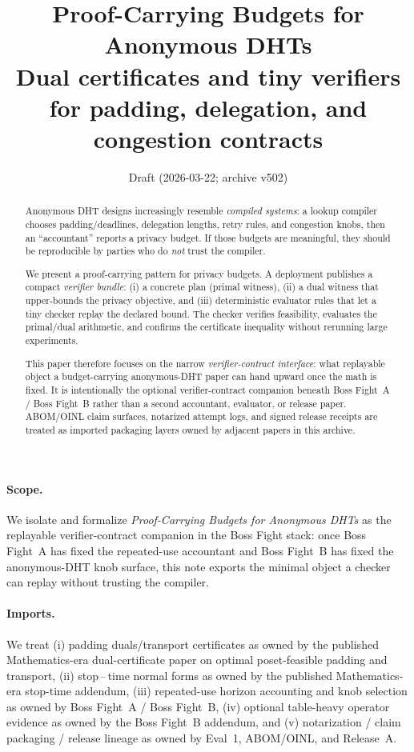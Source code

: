 \documentclass[11pt]{article}
\title{Proof-Carrying Budgets for Anonymous DHTs\\
\large Dual certificates and tiny verifiers for padding, delegation, and congestion contracts}
\author{}
\date{Draft (2026-03-22; archive v502)}
\begin{document}
\maketitle

\begin{abstract}
Anonymous DHT designs increasingly resemble \emph{compiled systems}: a lookup compiler chooses padding/deadlines, delegation lengths, retry rules, and congestion knobs, then an ``accountant'' reports a privacy budget.
If those budgets are meaningful, they should be reproducible by parties who do \emph{not} trust the compiler.

We present a proof-carrying pattern for privacy budgets.
A deployment publishes a compact \emph{verifier bundle}: (i) a concrete plan (primal witness), (ii) a dual witness that upper-bounds the privacy objective, and (iii) deterministic evaluator rules that let a tiny checker replay the declared bound.
The checker verifies feasibility, evaluates the primal/dual arithmetic, and confirms the certificate inequality without rerunning large experiments.

This paper therefore focuses on the narrow \emph{verifier-contract interface}: what replayable object a budget-carrying anonymous-DHT paper can hand upward once the math is fixed.
It is intentionally the optional verifier-contract companion beneath Boss Fight~A / Boss Fight~B rather than a second accountant, evaluator, or release paper.
ABOM/OINL claim surfaces, notarized attempt logs, and signed release receipts are treated as imported packaging layers owned by adjacent papers in this archive.
\end{abstract}

\paragraph{Scope.}
We isolate and formalize \emph{Proof-Carrying Budgets for Anonymous DHTs} as the replayable verifier-contract companion in the Boss Fight stack: once Boss Fight~A has fixed the repeated-use accountant and Boss Fight~B has fixed the anonymous-DHT knob surface, this note exports the minimal object a checker can replay without trusting the compiler.

\paragraph{Imports.}
We treat (i) padding duals/transport certificates as owned by the published Mathematics-era dual-certificate paper on optimal poset-feasible padding and transport,
(ii) stop\,--\,time normal forms as owned by the published Mathematics-era stop-time addendum,
(iii) repeated-use horizon accounting and knob selection as owned by Boss Fight~A / Boss Fight~B,
(iv) optional table-heavy operator evidence as owned by the Boss Fight~B addendum, and
(v) notarization / claim packaging / release lineage as owned by Eval~1, ABOM/OINL, and Release~A.\cite{series:bossfighta,series:bossfightb,series:bossfightBaddendum,series:evalnotary,series:abomoinl,series:releaseproperty}
\end{document}
